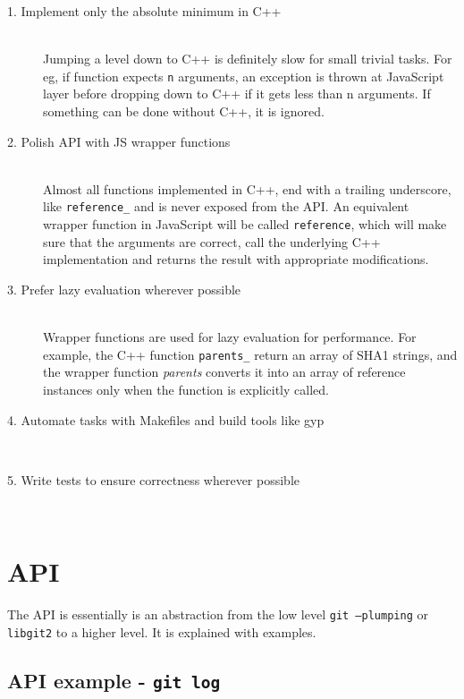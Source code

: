 \begin{description}

\item[1. Implement only the absolute minimum in C++] \hfill \\
  Jumping a level down to C++ is definitely slow for small trivial tasks. For
  eg, if function expects \texttt{n} arguments, an exception is thrown at
  JavaScript layer before dropping down to C++ if it gets less than n arguments.
  If something can be done without C++, it is ignored.

\item[2. Polish API with JS wrapper functions] \hfill \\
  Almost all functions implemented in C++, end with a trailing underscore, like
  \texttt{reference\_} and is never exposed from the API. An equivalent wrapper
  function in JavaScript will be called \texttt{reference}, which will make sure
  that the arguments are correct, call the underlying C++ implementation and
  returns the result with appropriate modifications.

\item[3. Prefer lazy evaluation wherever possible] \hfill \\
  Wrapper functions are used for lazy evaluation for performance. For example,
  the C++ function \texttt{parents\_} return an array of SHA1 strings, and the
  wrapper function \textit{parents} converts it into an array of reference
  instances only when the function is explicitly called.

\item[4. Automate tasks with Makefiles and build tools like gyp] \hfill \\
\item[5. Write tests to ensure correctness wherever possible] \hfill \\

\end{description}

\section{API}

The API is essentially is an abstraction from the low level \texttt{git
  --plumping} or \texttt{libgit2} to a higher level. It is explained with
examples.

\subsection{API example - \texttt{git log}}


